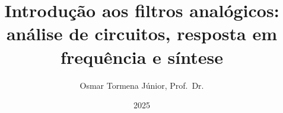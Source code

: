 \documentclass[%
	a5paper,%
	extrafontsizes,%
	oneside,%
	final%
	]{memoir}
\title{Introdução aos filtros analógicos: análise de circuitos, resposta em frequência e síntese}
\author{Osmar Tormena Júnior, Prof.\ Dr.}
\date{2025}
\begin{document}
\maketitle\clearpage

\tableofcontents*\clearpage
\listoffigures





\end{document}
